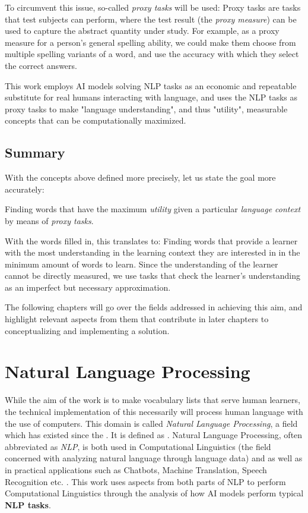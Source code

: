 To circumvent this issue, so-called \textit{proxy tasks} will be used:
Proxy tasks are tasks that test subjects can perform, where the test result (the \textit{proxy measure}) can be used to capture the abstract quantity under study.
For example, as a proxy measure for a person's general spelling ability, we could make them choose from multiple spelling variants of a word, and use the accuracy with which they select the correct answers.

This work employs AI models solving NLP tasks as an economic and repeatable substitute for real humans interacting with language, and uses the NLP tasks as proxy tasks to make "language understanding", and thus "utility", measurable concepts that can be computationally maximized.

\subsection{Summary}
With the concepts above defined more precisely, let us state the goal more accurately:

Finding words that have the maximum \textit{utility} given a particular \textit{language context} by means of \textit{proxy tasks}.

With the words filled in, this translates to:
Finding words that provide a learner with the most understanding in the learning context they are interested in in the minimum amount of words to learn.
Since the understanding of the learner cannot be directly measured, we use tasks that check the learner's understanding as an imperfect but necessary approximation.

The following chapters will go over the fields addressed in achieving this aim, and highlight relevant aspects from them that contribute in later chapters to conceptualizing and implementing a solution.


\section{Natural Language Processing} \label{sec:natural-language-processing}

While the aim of the work is to make vocabulary lists that serve human learners, the technical implementation of this necessarily will process human language with the use of computers.
This domain is called \textit{Natural Language Processing}, a field which has existed since the \toresearch.
It is defined as \toresearch {}.
Natural Language Processing, often abbreviated as \textit{NLP}, is both used in Computational Linguistics (the field concerned with analyzing natural language through language data) and as well as in practical applications such as Chatbots, Machine Translation, Speech Recognition etc. .
This work uses aspects from both parts of NLP to perform Computational Linguistics through the analysis of how AI models perform typical \textbf{NLP tasks}.

